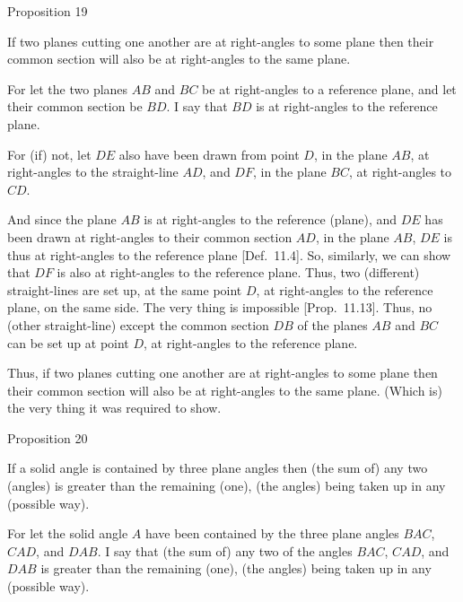 
\begin{center}
{\large Proposition 19}
\end{center}

If two planes cutting one another are at right-angles to some plane then their common section will also be at right-angles to the
same plane.

\epsfysize=2.2in
\centerline{}

For let the two planes $AB$ and $BC$ be at right-angles to a reference
plane, and let their common section be $BD$. I say that $BD$ is at right-angles to the reference plane.

For (if) not, let $DE$ also have been drawn from point $D$,  in the plane
$AB$, at right-angles to the straight-line $AD$, and $DF$, in the plane $BC$, at right-angles to $CD$.

And since the plane $AB$ is at right-angles to the reference (plane),
and $DE$ has been drawn at right-angles to their common section $AD$,
in the plane $AB$, $DE$ is thus at right-angles to the reference 
plane [Def.~11.4]. So, similarly, we can show that
$DF$ is also at right-angles to the reference plane. Thus, two (different) straight-lines
are set up, at the same point $D$, at right-angles to the reference plane,
on the same side. The very thing is impossible [Prop.~11.13]. Thus, no (other straight-line) except the common section
$DB$ of the planes $AB$ and $BC$ can be set up at point $D$,
at right-angles to the reference plane.

Thus, if two planes cutting one another are at right-angles to some plane then their common section will also be at right-angles to the
same plane. (Which is) the very thing it was required to show.


\begin{center}
{\large Proposition 20}
\end{center}

If a solid angle is contained by three plane angles
then (the sum of) any two (angles) is greater than the remaining (one), (the angles) being taken up in any (possible way).

\epsfysize=1.5in
\centerline{}

For let the solid angle $A$ have been contained by the three plane angles $BAC$, $CAD$, and $DAB$. I say that (the sum of) any two of the angles $BAC$, $CAD$, and $DAB$ is greater than the remaining (one),
(the angles) being taken up in any (possible way).

